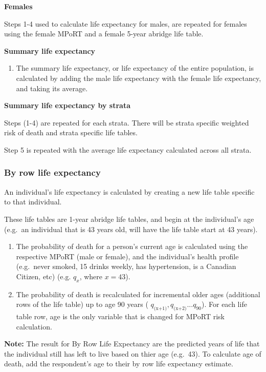 \documentclass[]{book}
\providecommand{\tightlist}{%
  \setlength{\itemsep}{0pt}\setlength{\parskip}{0pt}}
\begin{document}
\textbf{Females}

Steps 1-4 used to calculate life expectancy for males, are repeated for
females using the female MPoRT and a female 5-year abridge life table.

\textbf{Summary life expectancy}

\begin{enumerate}
\def\labelenumi{\arabic{enumi}.}
\setcounter{enumi}{4}
\tightlist
\item
  The summary life expectancy, or life expectancy of the entire
  population, is calculated by adding the male life expectancy with the
  female life expectancy, and taking its average.
\end{enumerate}

\textbf{Summary life expectancy by strata}

Steps (1-4) are repeated for each strata. There will be strata specific
weighted risk of death and strata specific life tables.

Step 5 is repeated with the average life expectancy calculated across
all strata.

\subsubsection{By row life expectancy}\label{by-row-life-expectancy}

An individual's life expectancy is calculated by creating a new life
table specific to that individual.

These life tables are 1-year abridge life tables, and begin at the
individual's age (e.g.~an individual that is 43 years old, will have the
life table start at 43 years).

\begin{enumerate}
\def\labelenumi{\arabic{enumi}.}
\item
  The probability of death for a person's current age is calculated
  using the respective MPoRT (male or female), and the individual's
  health profile (e.g.~never smoked, 15 drinks weekly, has hypertension,
  is a Canadian Citizen, etc) (e.g. \(q_x\), where \(x=43\)).
\item
  The probability of death is recalculated for incremental older ages
  (additional rows of the life table) up to age 90 years (
  \(q_\text{(x+1)}, q_\text{(x+2)}...q_{90}\)). For each life table row,
  age is the only variable that is changed for MPoRT risk calculation.
\end{enumerate}

\textbf{Note:} The result for By Row Life Expectancy are the predicted
years of life that the individual still has left to live based on thier
age (e.g.~43). To calculate age of death, add the respondent's age to
their by row life expectancy estimate.
\end{document}
